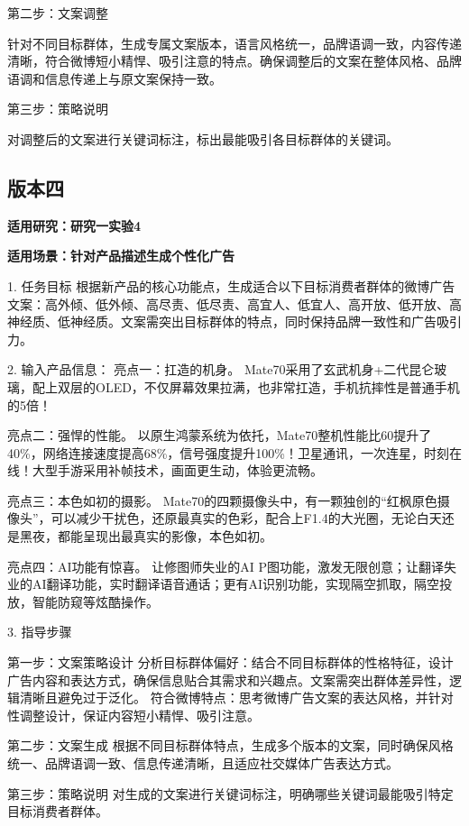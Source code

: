 第二步：文案调整

针对不同目标群体，生成专属文案版本，语言风格统一，品牌语调一致，内容传递清晰，符合微博短小精悍、吸引注意的特点。确保调整后的文案在整体风格、品牌语调和信息传递上与原文案保持一致。

第三步：策略说明

对调整后的文案进行关键词标注，标出最能吸引各目标群体的关键词。

\subsection*{版本四}

\textbf{适用研究：研究一实验4}

\textbf{适用场景：针对产品描述生成个性化广告}

\vspace{1\baselineskip} %

1. 任务目标
根据新产品的核心功能点，生成适合以下目标消费者群体的微博广告文案：高外倾、低外倾、高尽责、低尽责、高宜人、低宜人、高开放、低开放、高神经质、低神经质。文案需突出目标群体的特点，同时保持品牌一致性和广告吸引力。
\vspace{1\baselineskip} %

2. 输入产品信息：
亮点一：扛造的机身。
Mate70采用了玄武机身+二代昆仑玻璃，配上双层的OLED，不仅屏幕效果拉满，也非常扛造，手机抗摔性是普通手机的5倍！

亮点二：强悍的性能。
以原生鸿蒙系统为依托，Mate70整机性能比60提升了40\%，网络连接速度提高68\%，信号强度提升100\%！卫星通讯，一次连星，时刻在线！大型手游采用补帧技术，画面更生动，体验更流畅。

亮点三：本色如初的摄影。
Mate70的四颗摄像头中，有一颗独创的“红枫原色摄像头”，可以减少干扰色，还原最真实的色彩，配合上F1.4的大光圈，无论白天还是黑夜，都能呈现出最真实的影像，本色如初。

亮点四：AI功能有惊喜。
让修图师失业的AI P图功能，激发无限创意；让翻译失业的AI翻译功能，实时翻译语音通话；更有AI识别功能，实现隔空抓取，隔空投放，智能防窥等炫酷操作。
\vspace{1\baselineskip} %


3. 指导步骤

第一步：文案策略设计
分析目标群体偏好：结合不同目标群体的性格特征，设计广告内容和表达方式，确保信息贴合其需求和兴趣点。文案需突出群体差异性，逻辑清晰且避免过于泛化。
符合微博特点：思考微博广告文案的表达风格，并针对性调整设计，保证内容短小精悍、吸引注意。

第二步：文案生成
根据不同目标群体特点，生成多个版本的文案，同时确保风格统一、品牌语调一致、信息传递清晰，且适应社交媒体广告表达方式。

第三步：策略说明
对生成的文案进行关键词标注，明确哪些关键词最能吸引特定目标消费者群体。